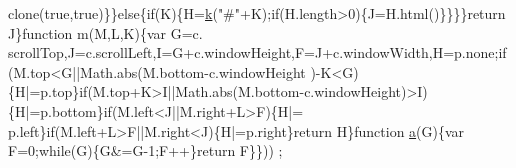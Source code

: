 \begin{DoxyCode}
      clone(\textcolor{keyword}{true},\textcolor{keyword}{true})\}\}\textcolor{keywordflow}{else}\{\textcolor{keywordflow}{if}(K)\{H=\hyperlink{jquery_8js_ab26645c014aa005ecedef329ecf58c99}{k}(\textcolor{stringliteral}{"#"}+K);\textcolor{keywordflow}{if}(H.length>0)\{J=H.html()\}\}\}\}\textcolor{keywordflow}{return} J\}\textcolor{keyword}{function} m(M,L,K)\{var G=c.
      scrollTop,J=c.scrollLeft,I=G+c.windowHeight,F=J+c.windowWidth,H=p.none;\textcolor{keywordflow}{if}(M.top<G||Math.abs(M.bottom-c.windowHeight
      )-K<G)\{H|=p.top\}\textcolor{keywordflow}{if}(M.top+K>I||Math.abs(M.bottom-c.windowHeight)>I)\{H|=p.bottom\}\textcolor{keywordflow}{if}(M.left<J||M.right+L>F)\{H|=
      p.left\}\textcolor{keywordflow}{if}(M.left+L>F||M.right<J)\{H|=p.right\}\textcolor{keywordflow}{return} H\}\textcolor{keyword}{function} \hyperlink{jquery_8js_aa4d4888597588a84fd5b1184d00c91f3}{a}(G)\{var F=0;\textcolor{keywordflow}{while}(G)\{G&=G-1;F++\}\textcolor{keywordflow}{return} F\}\}))
      ;
\end{DoxyCode}
